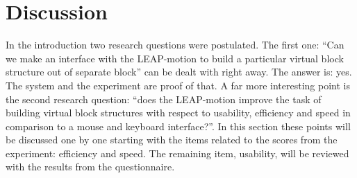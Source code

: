 \section{Discussion}

In the introduction two research questions were postulated. The first one: “Can we make an interface with the LEAP-motion to build a particular virtual block structure out of separate block” can be dealt with right away. The answer is: yes. The system and the experiment are proof of that. A far more interesting point is the second research question: “does the LEAP-motion improve the task of building virtual block structures with respect to usability, efficiency and speed in comparison to a mouse and keyboard interface?”. In this section these points will be discussed one by one starting with the items related to the scores from the experiment: efficiency and speed. The remaining item, usability, will be reviewed with the results from the questionnaire.



